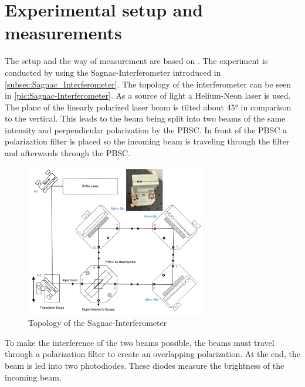 \section{Experimental setup and measurements}
The setup and the way of measurement are based on \cite{anleitungV64}.
\label{sec:Experimentale}
The experiment is conducted by using the Sagnac-Interferometer introduced in \ref{subsec:Sagnac_Interferometer}. 
The topology of the interferometer can be seen in \autoref{pic:Sagnac-Interferometer}. As a 
source of light a Helium-Neon laser is used. The plane of the linearly polarized laser beam is tilted about $45°$ in comparison to 
the vertical. This leads to the beam being split into two beams of the same intensity and perpendicular polarization by the PBSC.
In front of the PBSC a polarization filter is placed so the incoming beam is traveling through the filter and afterwards through the 
PBSC. 

\begin{figure}
    \centering
    \includegraphics[width=0.70\textwidth]{content/Bilder/Sagnac_Interferometer.jpeg}
    \caption{Topology of the Sagnac-Interferometer \cite{anleitungV64}}
    \label{pic:Sagnac-Interferometer}
  \end{figure}

To make the interference of the two beams possible, the beams must travel through a polarization filter to create an overlapping polarization. 
At the end, the beam is led into two photodiodes. These diodes measure the brightness of the incoming beam. 

